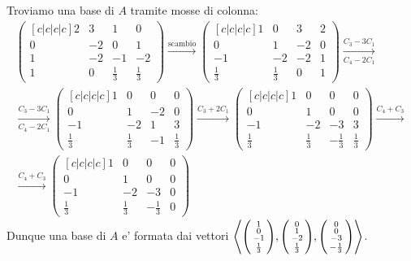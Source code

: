 \begin{solution}
    Troviamo una base di $A$ tramite mosse di colonna:
    \begin{gather*}
        \begin{pmatrix}[c|c|c|c]
            2&3&1&0\\0&-2&0&1\\1&-2&-1&-2\\1&0&\frac13&\frac13
        \end{pmatrix} \xrightarrow[]{\text{scambio}}
        \begin{pmatrix}[c|c|c|c]
            1&0&3&2\\0&1&-2&0\\-1&-2&-2&1\\\frac13&\frac13&0&1
        \end{pmatrix} \xrightarrow[C_4 - 2C_1]{C_3 - 3C_1} \\
        \xrightarrow[C_4 - 2C_1]{C_3 - 3C_1} \begin{pmatrix}[c|c|c|c]
            1&0&0&0\\0&1&-2&0\\-1&-2&1&3\\\frac13&\frac13&-1&\frac13
        \end{pmatrix} \xrightarrow[]{C_3 + 2C_1}
        \begin{pmatrix}[c|c|c|c]
            1&0&0&0\\0&1&0&0\\-1&-2&-3&3\\\frac13&\frac13&-\frac13&\frac13
        \end{pmatrix} \xrightarrow[]{C_4 + C_3} \\ \xrightarrow[]{C_4 + C_3}
        \begin{pmatrix}[c|c|c|c]
            1&0&0&0\\0&1&0&0\\-1&-2&-3&0\\\frac13&\frac13&-\frac13&0
        \end{pmatrix}
    \end{gather*}
    Dunque una base di $A$ e' formata dai vettori $\left\langle \begin{psmallmatrix}1\\0\\-1\\\frac13 \end{psmallmatrix}, \begin{psmallmatrix}0\\1\\-2\\\frac13 \end{psmallmatrix}, \begin{psmallmatrix}0\\0\\-3\\-\frac13 \end{psmallmatrix}  \right\rangle$.


\end{solution}
